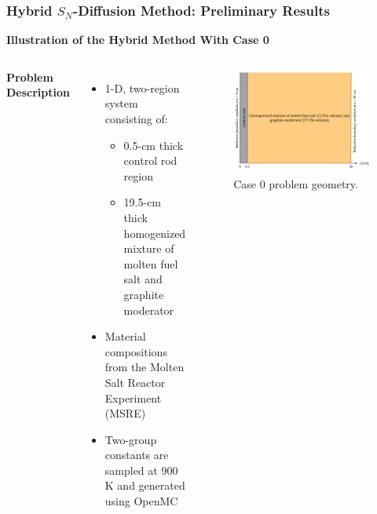 \begin{frame}
  \frametitle{Hybrid $S_N$-Diffusion Method: Preliminary Results}
  \textbf{Illustration of the Hybrid Method With Case 0} \\
  \begin{columns}
    \column[t]{5.5cm}
    \textbf{Problem Description}
    \begin{itemize}
      \item 1-D, two-region system consisting of:
      \begin{itemize}
        \item 0.5-cm thick control rod region
        \item 19.5-cm thick homogenized mixture of molten fuel salt and graphite moderator
      \end{itemize}
      \item Material compositions from the Molten Salt Reactor Experiment (MSRE)
      \item Two-group constants are sampled at 900 K and generated using OpenMC
    \end{itemize}
    \column[t]{5.5cm}
    \begin{figure}[htb!]
      \centering
      \includegraphics[width=\columnwidth]{../images/case-0-geometry}
      \caption{Case 0 problem geometry.}
      \label{fig:case-0-geom}
    \end{figure}
  \end{columns}
\end{frame}

